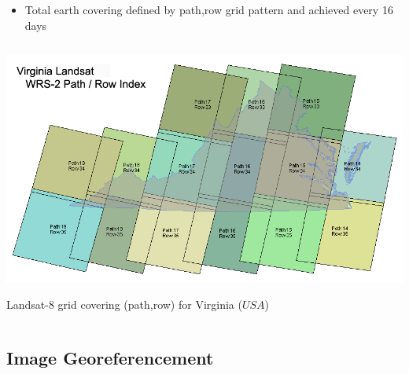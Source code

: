 \documentclass[c]{beamer}
\begin{document}
\begin{frame}

\begin{itemize}
\item Total earth covering defined by path,row grid pattern and achieved every 16 days
\end{itemize}
\begin{columns}
\begin{column}{\textwidth}
\begin{overlayarea}{\linewidth}{4cm}
  \centering\vfill
  \includegraphics[scale=0.2]{images/covering/wrs.png}
\end{overlayarea}
\begin{overlayarea}{\linewidth}{1cm}
  \centering
  \tiny Landsat-8 grid covering (path,row) for Virginia ($USA$)\par
\end{overlayarea}
\end{column}
\end{columns}

\end{frame}

\subsection{Image Georeferencement}
\begin{frame}
\tableofcontents[currentsubsection]
\end{frame}
\end{document}

